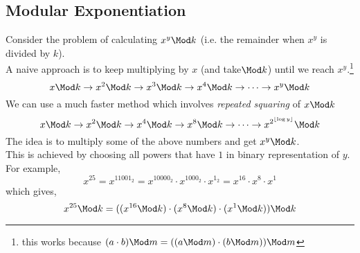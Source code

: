 \documentclass[../../Problems]{subfiles}
\begin{document}
\recalctypearea
\subsection{Modular Exponentiation}
Consider the problem of calculating $x^y\Mod k$ (i.e. the remainder when $x^y$ is divided by $k$).\\
A naive approach is to keep multiplying by $x$ (and take$\Mod k$) until we reach $x^y$.\footnote{this works because $(a\cdot b)\Mod m =  ((a\Mod m)\cdot(b\Mod m))\Mod m$}
\begin{equation*}
x \Mod k \rightarrow x^2 \Mod k \rightarrow x^3 \Mod k \rightarrow x^4 \Mod k \rightarrow \cdots \rightarrow x^y \Mod k
\end{equation*}
We can use a much faster method which involves \emph{repeated squaring} of $x \Mod k$
\begin{equation}
x \Mod k \rightarrow x^2 \Mod k \rightarrow x^4 \Mod k \rightarrow x^8 \Mod k \rightarrow \cdots \rightarrow x^{2^{\lfloor\log y\rfloor}} \Mod k
\end{equation}
The idea is to multiply some of the above numbers and get $x^y \Mod k$.\\
This is achieved by choosing all powers that have $1$ in binary representation of $y$.\\
For example,
\begin{equation*}
x^{25} = x ^ {11001_2} = x ^ {10000_2} \cdot x ^ {1000_2} \cdot x ^ {1_2} = x ^ {16} \cdot x ^ 8 \cdot x ^ 1
\end{equation*}
which gives,
\begin{equation*}
x^{25} \Mod k  = ((x ^ {16} \Mod k)\cdot (x ^ 8\Mod k)  \cdot (x ^ 1\Mod k)) \Mod k
\end{equation*}
\end{document}
